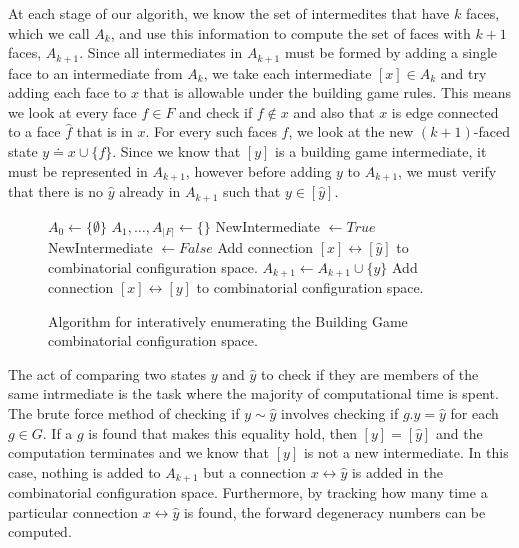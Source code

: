 At each stage of our algorith, we know the set of intermedites that have $k$ faces, which we call $A_k$, and use this information to compute the set of faces with $k+1$ faces, $A_{k+1}$. Since all intermediates in $A_{k+1}$ must be formed by adding a single face to an intermediate from $A_k$, we take each intermediate $[x] \in A_k$ and try adding each face to $x$ that is allowable under the building game rules. This means we look at every face $f \in F$ and check if $f \not\in x$ and also that $x$ is edge connected to a face $\hat{f}$ that is in $x$. For every such faces $f$, we look at the new $(k+1)$-faced state $y \doteq x\cup \{f\}$. Since we know that $[y]$ is a building game intermediate, it must be represented in $A_{k+1}$, however before adding $y$ to $A_{k+1}$, we must verify that there is no $\hat{y}$ already in $A_{k+1}$ such that $y \in [\hat{y}]$.

\begin{figure}[ht]
\centering
\begin{algorithmic}
  \State $A_0 \gets \{\emptyset\}$ 
  \State $A_1, \dots, A_{|F|} \gets \{\}$ 
  \State NewIntermediate $\gets True$
  \State NewIntermediate $\gets False$
  \State Add connection $[x] \leftrightarrow [\hat{y}]$ to combinatorial configuration space.
  \EndIf
  \EndFor
  \State $A_{k+1} \gets A_{k+1} \cup \{y\}$
  \State Add connection $[x] \leftrightarrow [y]$ to combinatorial configuration space.
  \EndIf
  \EndFor
  \EndFor
  \EndFor
\end{algorithmic}
\caption{Algorithm for interatively enumerating the Building Game combinatorial configuration space.}
\label{alg:CCS}
\end{figure}

The act of comparing two states $y$ and $\hat{y}$ to check if they are members of the same intrmediate is the task where the majority of computational time is spent. The brute force method of checking if $y \sim \hat{y}$ involves checking if $g.y = \hat{y}$ for each $g \in G$. If a $g$ is found that makes this equality hold, then $[y] = [ \hat{y}]$ and the computation terminates and we know that $[y]$ is not a new intermediate. In this case, nothing is added to $A_{k+1}$ but a connection $x \leftrightarrow \hat{y}$ is added in the combinatorial configuration space. Furthermore, by tracking how many time a particular connection $x \leftrightarrow \hat{y}$ is found, the forward degeneracy numbers can be computed. 


